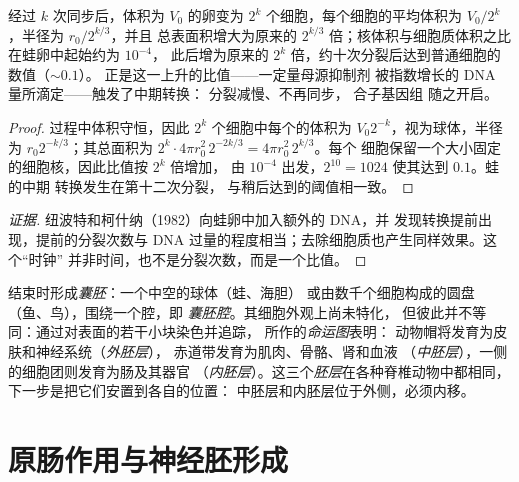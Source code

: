 \begin{theorem}[卵裂的算术]\label{thm:b2:vertebrate-development:cleavage}
经过 $k$ 次同步后，体积为 $V_0$ 的卵变为 $2^{k}$
个细胞，每个细胞的平均体积为 $V_0/2^{k}$，半径为 $r_0/2^{k/3}$，并且
总表面积增大为原来的 $2^{k/3}$ 倍；核体积与细胞质体积之比
在蛙卵中起始约为 $10^{-4}$，
此后增为原来的 $2^{k}$ 倍，约十次分裂后达到普通细胞的数值（$\sim 0.1$）。
正是这一上升的比值——一定量母源抑制剂
被指数增长的 DNA 量所滴定——触发了中期转换：
分裂减慢、不再同步，
合子基因组
随之开启。
\end{theorem}
\begin{proof}
过程中体积守恒，因此 $2^{k}$ 个细胞中每个的体积为 $V_0
2^{-k}$，视为球体，半径为 $r_0 2^{-k/3}$；其总面积为
$2^{k}\cdot 4\pi r_0^{2}\, 2^{-2k/3} = 4\pi r_0^{2}\, 2^{k/3}$。每个
细胞保留一个大小固定的细胞核，因此比值按 $2^{k}$ 倍增加，
由 $10^{-4}$ 出发，$2^{10} = 1024$ 使其达到 $0.1$。蛙的中期
转换发生在第十二次分裂，
与稍后达到的阈值相一致。
\end{proof}
\begin{proof}[证据]
纽波特和柯什纳（1982）向蛙卵中加入额外的 DNA，并
发现转换提前出现，提前的分裂次数与
DNA 过量的程度相当；去除细胞质也产生同样效果。这个“时钟”
并非时间，也不是分裂次数，而是一个比值。
\end{proof}

\begin{definition}[囊胚]\label{def:b2:vertebrate-development:blastula}
结束时形成\emph{囊胚}：一个中空的球体（蛙、海胆）
或由数千个细胞构成的圆盘（鱼、鸟），围绕一个腔，即
\emph{囊胚腔}。其细胞外观上尚未特化，
但彼此并不等同：通过对表面的若干小块染色并追踪，
所作的\emph{命运图}表明：
动物帽将发育为皮肤和神经系统（\emph{外胚层}），
赤道带发育为肌肉、骨骼、肾和血液
（\emph{中胚层}），一侧的细胞团则发育为肠及其器官
（\emph{内胚层}）。这三个\emph{胚层}在各种脊椎动物中都相同，
下一步是把它们安置到各自的位置：
中胚层和内胚层位于外侧，必须内移。
\end{definition}

\section{原肠作用与神经胚形成}

